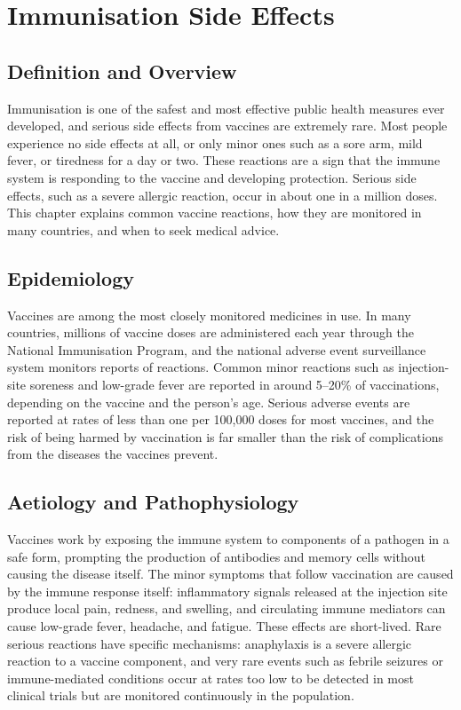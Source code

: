 \chapter{Immunisation Side Effects}

\section*{Definition and Overview}
Immunisation is one of the safest and most effective public health measures ever developed, and serious side effects from vaccines are extremely rare. Most people experience no side effects at all, or only minor ones such as a sore arm, mild fever, or tiredness for a day or two. These reactions are a sign that the immune system is responding to the vaccine and developing protection. Serious side effects, such as a severe allergic reaction, occur in about one in a million doses. This chapter explains common vaccine reactions, how they are monitored in many countries, and when to seek medical advice.

\section*{Epidemiology}
Vaccines are among the most closely monitored medicines in use. In many countries, millions of vaccine doses are administered each year through the National Immunisation Program, and the national adverse event surveillance system monitors reports of reactions. Common minor reactions such as injection-site soreness and low-grade fever are reported in around 5--20\% of vaccinations, depending on the vaccine and the person's age. Serious adverse events are reported at rates of less than one per 100,000 doses for most vaccines, and the risk of being harmed by vaccination is far smaller than the risk of complications from the diseases the vaccines prevent.

\section*{Aetiology and Pathophysiology}
Vaccines work by exposing the immune system to components of a pathogen in a safe form, prompting the production of antibodies and memory cells without causing the disease itself. The minor symptoms that follow vaccination are caused by the immune response itself: inflammatory signals released at the injection site produce local pain, redness, and swelling, and circulating immune mediators can cause low-grade fever, headache, and fatigue. These effects are short-lived. Rare serious reactions have specific mechanisms: anaphylaxis is a severe allergic reaction to a vaccine component, and very rare events such as febrile seizures or immune-mediated conditions occur at rates too low to be detected in most clinical trials but are monitored continuously in the population.

